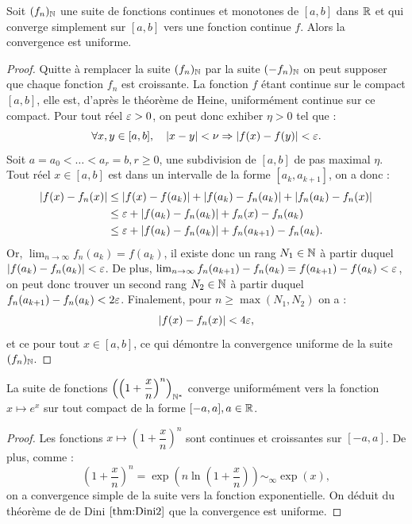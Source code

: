 \begin{thm}
\label{thm:Dini2}
Soit $(f_n)_{\mathbb{N}}$ une suite de fonctions continues et monotones de $[a,b]$ dans $\mathbb{R}$ et qui converge simplement sur $[a,b]$
vers une fonction continue $f$. Alors la convergence est uniforme.
\end{thm}

\begin{proof}
Quitte à remplacer la suite $(f_n)_{\mathbb{N}}$ par la suite $(-f_n)_{\mathbb{N}}$ on peut supposer que chaque fonction $f_n$ est croissante.
La fonction $f$ étant continue sur le compact $[a,b]$, elle est, d'après le théorème de Heine, uniformément continue sur ce compact.
Pour tout réel $\varepsilon >0$, on peut donc exhiber $\eta >0$ tel que :
\[ \forall x,y \in [a,b], \quad \lvert x-y\rvert < \nu \Rightarrow \lvert f(x)-f(y)\rvert < \varepsilon . \]
Soit $a=a_0 < \dots < a_r=b, r \geq 0$, une subdivision de $[a,b]$ de pas maximal $\eta$. 
Tout réel $x \in [a,b]$ est dans un intervalle de la forme $[a_k, a_{k+1}]$, on a donc :
\begin{align*}
\lvert f(x)-f_n(x)\rvert & \leq \lvert f(x) - f(a_k)\rvert + \lvert f(a_k)-f_n(a_k)\rvert + \lvert f_n(a_k) - f_n(x)\rvert \\
& \leq \varepsilon + \lvert f(a_k)-f_n(a_k)\rvert + f_n(x) - f_n(a_k) \\
& \leq \varepsilon + \lvert f(a_k)-f_n(a_k)\rvert + f_n(a_{k+1}) - f_n(a_k) .
\end{align*}
Or, $\lim_{n \to \infty} f_n(a_k) = f(a_k)$, il existe donc un rang $N_1 \in \mathbb{N}$ à partir duquel $\lvert f(a_k)-f_n(a_k)\rvert < \varepsilon$.
De plus, $\lim_{n \to \infty} f_n(a_{k+1}) - f_n(a_k) = f(a_{k+1}) - f(a_k) < \varepsilon$, on peut donc trouver un second rang $N_2 \in \mathbb{N}$
à partir duquel $f_n(a_{k+1}) - f_n(a_k) < 2 \varepsilon$. 
Finalement, pour $n \geq \max(N_1, N_2)$ on a :
\[ \lvert f(x)-f_n(x)\rvert < 4 \varepsilon , \]
et ce pour tout $x \in [a,b]$, ce qui démontre la convergence uniforme de la suite $(f_n)_{\mathbb{N}}$.
\end{proof}

\begin{appl}
La suite de fonctions $\left ( \left (1+\dfrac{x}{n} \right)^n \right)_{\mathbb{N}^\ast}$ converge uniformément vers la fonction $x \mapsto e^x$ sur
tout compact de la forme $[-a, a], a \in \mathbb{R}$.
\end{appl}

\begin{proof}
Les fonctions $x \mapsto \left (1+\dfrac{x}{n} \right)^n$ sont continues et croissantes sur $[-a,a]$.
De plus, comme :
\[ \left (1+\dfrac{x}{n} \right)^n = \exp \left ( n \ln \left ( 1 + \dfrac{x}{n} \right) \right ) \sim_{\infty} \exp(x), \]
on a convergence simple de la suite vers la fonction exponentielle. On déduit du théorème de de Dini $\ref{thm:Dini2}$ que la
convergence est uniforme.
\end{proof}

